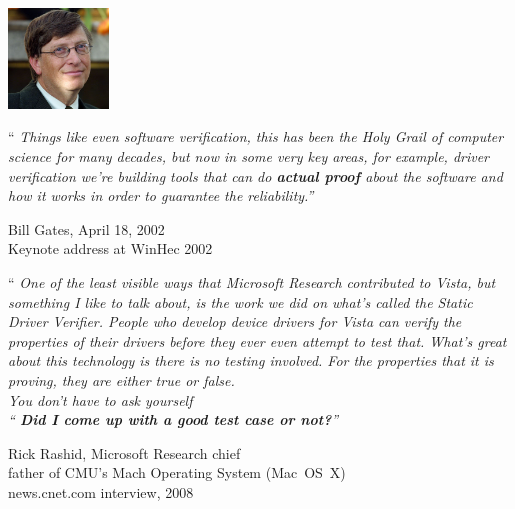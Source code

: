 \begin{frame}

\includegraphics[width=0.2\textwidth]{bill_gates_718639}
\vfill

\begin{center}
\colorbox{tabutter!50!white}{
\begin{minipage}{0.8\textwidth}
\begin{center}
``{\it\rmfamily
Things like even software verification, this has been the Holy Grail of
computer science for many decades, but now in some very key areas, for example,
driver verification we're building tools that can do
{\bf\slshape\rmfamily actual proof} about the
software and how it works in order to guarantee the reliability.''}
\end{center}
\end{minipage}}
\end{center}
\vfill

\hfill {\footnotesize Bill Gates, April 18, 2002}\\
\hfill {\footnotesize Keynote address at WinHec 2002}

\end{frame}


\begin{frame}

\begin{center}
\colorbox{tabutter!50!white}{
\begin{minipage}{0.9\textwidth}
\begin{center}
``{\it\rmfamily
One of the least visible ways that Microsoft Research contributed to Vista,
but something I like to talk about, is the work we did on what's called the
Static Driver Verifier.  People who develop device drivers for Vista can
verify the properties of their drivers before they ever even attempt to test
that.  What's great about this technology is there is no testing involved. 
For the properties that it is proving, they are either true or false.\\
You don't have to ask yourself \\
``{\bf\slshape\rmfamily
Did I come up with a good test case or not?}''}
\end{center}
\end{minipage}}
\end{center}
\vfill

\hfill {\footnotesize Rick Rashid, Microsoft Research chief}\\
\hfill {\footnotesize father of CMU's Mach Operating System (Mac~OS~X)}\\
\hfill {\footnotesize news.cnet.com interview, 2008}

\end{frame}

